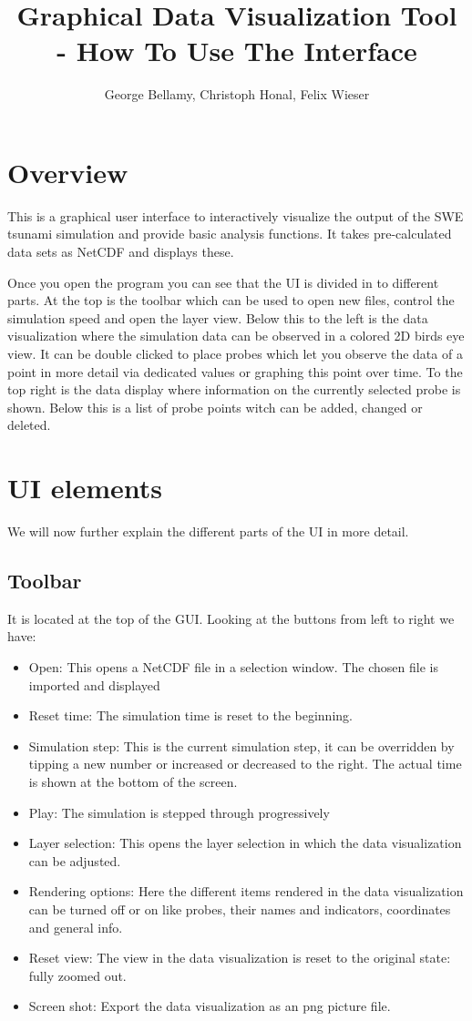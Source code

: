 \documentclass[paper=a4]{proc}
\title{Graphical Data Visualization Tool - How To Use The Interface}
\author{George Bellamy, Christoph Honal, Felix Wieser}
\begin{document}
	\maketitle
	\pagestyle{plain}	%
	\section{Overview}
		This is a graphical user interface to interactively visualize the output of the SWE tsunami simulation and provide basic analysis functions. It takes pre-calculated data sets as NetCDF and displays these. 
		
Once you open the program you can see that the UI is divided in to different parts. At the top is the toolbar which can be used to open new files, control the simulation speed and open the layer view. Below this to the left is the data visualization where the simulation data can be observed in a colored 2D birds eye view. It can be double clicked to place probes which let you observe the data of a point in more detail via dedicated values or graphing this point over time.
To the top right is the data display where information on the currently selected probe is shown. Below this is a list of probe points witch can be added, changed or deleted.
		
	\section{UI elements}
	We will now further explain the different parts of the UI in more detail. 
	
		\subsection{Toolbar}
		It is located at the top of the GUI. Looking at the buttons from left to right we have:
		\begin{itemize}
		\item Open: This opens a NetCDF file in a selection window. The chosen file is imported and displayed
		\item Reset time: The simulation time is reset to the beginning.
		\item Simulation step: This is the current simulation step, it can be overridden by tipping a new number or increased or decreased to the right. The actual time is shown at the bottom of the screen.
		\item Play: The simulation is stepped through progressively
		\item Layer selection: This opens the layer selection in which the data visualization can be adjusted.
		\item Rendering options: Here the different items rendered in the data visualization can be turned off or on like probes, their names and indicators, coordinates and general info.
		\item Reset view: The view in the data visualization is reset to the original state: fully zoomed out.
		\item Screen shot: Export the data visualization as an png picture file.
		
		\end{itemize}
		
\end{document}
